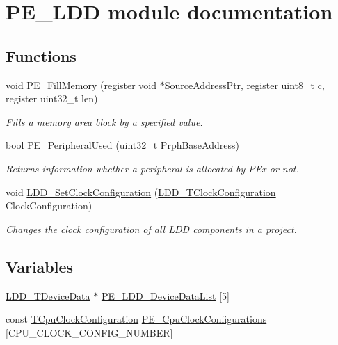 \hypertarget{group___p_e___l_d_d__module}{}\section{P\+E\+\_\+\+L\+DD module documentation}
\label{group___p_e___l_d_d__module}
\subsection*{Functions}
\begin{DoxyCompactItemize}
\item 
void \hyperlink{group___p_e___l_d_d__module_ga6cb22864b71fd00f200c9fb3375f4e29}{P\+E\+\_\+\+Fill\+Memory} (register void $\ast$Source\+Address\+Ptr, register uint8\+\_\+t c, register uint32\+\_\+t len)
\begin{DoxyCompactList}\small\item\em Fills a memory area block by a specified value. \end{DoxyCompactList}\item 
bool \hyperlink{group___p_e___l_d_d__module_ga9e049b01a45212fe5b6a8476fe124b59}{P\+E\+\_\+\+Peripheral\+Used} (uint32\+\_\+t Prph\+Base\+Address)
\begin{DoxyCompactList}\small\item\em Returns information whether a peripheral is allocated by P\+Ex or not. \end{DoxyCompactList}\item 
void \hyperlink{group___p_e___l_d_d__module_ga7fe8a131453ba765c5e85130a282eafb}{L\+D\+D\+\_\+\+Set\+Clock\+Configuration} (\hyperlink{group___p_e___types__module_ga369bcaf7f00caad5f994c72ac2629a37}{L\+D\+D\+\_\+\+T\+Clock\+Configuration} Clock\+Configuration)
\begin{DoxyCompactList}\small\item\em Changes the clock configuration of all L\+DD components in a project. \end{DoxyCompactList}\end{DoxyCompactItemize}
\subsection*{Variables}
\begin{DoxyCompactItemize}
\item 
\hyperlink{group___p_e___types__module_gac5cf1362f1f0e3a2ce71b1bf2276d091}{L\+D\+D\+\_\+\+T\+Device\+Data} $\ast$ \hyperlink{group___p_e___l_d_d__module_ga1b8ed70cbe26b6b5e879826492ef096d}{P\+E\+\_\+\+L\+D\+D\+\_\+\+Device\+Data\+List} \mbox{[}5\mbox{]}
\item 
const \hyperlink{struct_t_cpu_clock_configuration}{T\+Cpu\+Clock\+Configuration} \hyperlink{group___p_e___l_d_d__module_gab69281f0e90d16198a5595ed7f471441}{P\+E\+\_\+\+Cpu\+Clock\+Configurations} \mbox{[}C\+P\+U\+\_\+\+C\+L\+O\+C\+K\+\_\+\+C\+O\+N\+F\+I\+G\+\_\+\+N\+U\+M\+B\+ER\mbox{]}
\end{DoxyCompactItemize}


